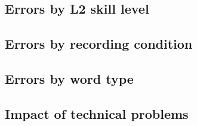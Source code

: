			\TODO{}
		
		\subsection{Errors by L2 skill level}
		\label{sec:results:level}
		
			\TODO{}
		
		\subsection{Errors by recording condition}
		\label{sec:results:condition}
			\TODO{}
		
		
		\subsection{Errors by word type}
		\label{sec:results:wordtype}
			\TODO{}
	
		\subsection{Impact of technical problems}
		\label{sec:results:techproblems}
			\TODO{}
